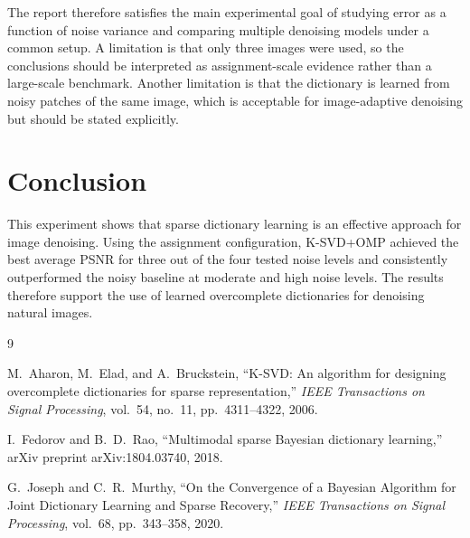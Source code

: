 \documentclass[11pt]{article}
\begin{document}
The report therefore satisfies the main experimental goal of studying error as a function of noise variance and comparing multiple denoising models under a common setup. A limitation is that only three images were used, so the conclusions should be interpreted as assignment-scale evidence rather than a large-scale benchmark. Another limitation is that the dictionary is learned from noisy patches of the same image, which is acceptable for image-adaptive denoising but should be stated explicitly.

\section{Conclusion}
This experiment shows that sparse dictionary learning is an effective approach for image denoising. Using the assignment configuration, K-SVD+OMP achieved the best average PSNR for three out of the four tested noise levels and consistently outperformed the noisy baseline at moderate and high noise levels. The results therefore support the use of learned overcomplete dictionaries for denoising natural images.

\begin{thebibliography}{9}

M.~Aharon, M.~Elad, and A.~Bruckstein,
``K-SVD: An algorithm for designing overcomplete dictionaries for sparse representation,''
\emph{IEEE Transactions on Signal Processing},
vol.~54, no.~11, pp.~4311--4322, 2006.

I.~Fedorov and B.~D.~Rao,
``Multimodal sparse Bayesian dictionary learning,''
arXiv preprint arXiv:1804.03740, 2018.

G.~Joseph and C.~R.~Murthy,
``On the Convergence of a Bayesian Algorithm for Joint Dictionary Learning and Sparse Recovery,''
\emph{IEEE Transactions on Signal Processing},
vol.~68, pp.~343--358, 2020.

\end{thebibliography}
\end{document}
